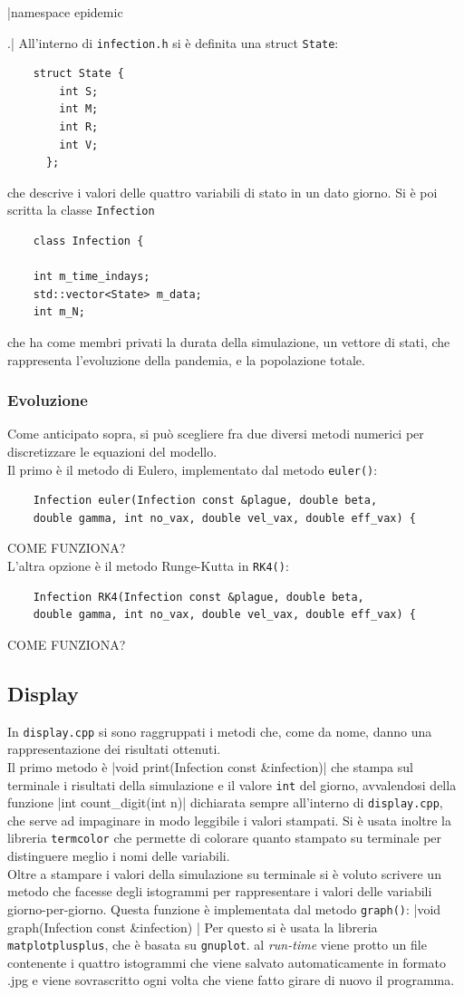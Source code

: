 \documentclass{article}
\begin{document}
|namespace epidemic{.|
All'interno di \verb|infection.h| si è definita una struct 
\verb|State|: 
\begin{verbatim}
    struct State {
        int S; 
        int M; 
        int R; 
        int V; 
      };
\end{verbatim}
che descrive i valori delle quattro variabili di stato in un dato giorno.
Si è poi scritta la classe \verb|Infection|
\begin{verbatim}
    class Infection {

    int m_time_indays; 
    std::vector<State> m_data; 
    int m_N; 
\end{verbatim}    
che ha come membri privati la durata della simulazione, un vettore di 
stati, che rappresenta l'evoluzione della pandemia, e la popolazione 
totale.
\subsubsection{Evoluzione}
Come anticipato sopra, si può scegliere fra due diversi metodi 
numerici per discretizzare le equazioni del modello.\\
Il primo è il metodo di Eulero, implementato dal metodo 
\verb|euler()|:
\begin{verbatim}
    Infection euler(Infection const &plague, double beta, 
    double gamma, int no_vax, double vel_vax, double eff_vax) {
\end{verbatim}
COME FUNZIONA?\\
L'altra opzione è il metodo Runge-Kutta in \verb|RK4()|:
\begin{verbatim}
    Infection RK4(Infection const &plague, double beta, 
    double gamma, int no_vax, double vel_vax, double eff_vax) {
\end{verbatim}
COME FUNZIONA?
\subsection{Display}
In \verb|display.cpp| si sono raggruppati i metodi che, come da 
nome, danno una rappresentazione dei risultati ottenuti.\\
Il primo metodo è 
|void print(Infection const &infection){|
che stampa sul terminale i risultati della simulazione e il valore 
\verb|int| del giorno, avvalendosi della funzione 
|int count_digit(int n){|
dichiarata sempre all'interno di \verb|display.cpp|, che serve ad 
impaginare in modo leggibile i valori stampati.
Si è usata inoltre la libreria \verb|termcolor| che permette di 
colorare quanto stampato su terminale per distinguere meglio
i nomi delle variabili. \\
Oltre a stampare i valori della simulazione su terminale si è voluto
scrivere un metodo che facesse degli istogrammi per rappresentare i
valori delle variabili giorno-per-giorno.
Questa funzione è implementata dal metodo \verb|graph()|:
|void graph(Infection const &infection) {|
Per questo si è usata la libreria \verb|matplotplusplus|, che è 
basata su \verb|gnuplot|. al \textit{run-time} viene protto un 
file contenente i quattro istogrammi che viene salvato 
automaticamente in formato .jpg e viene sovrascritto ogni volta che
viene fatto girare di nuovo il programma.
}}}}
\end{document}
